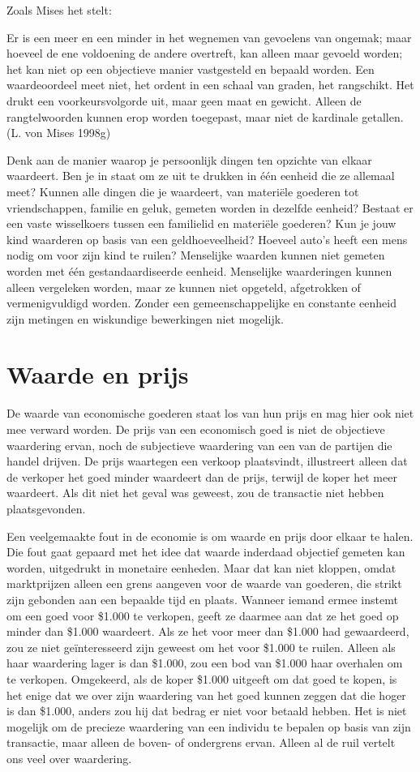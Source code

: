 \documentclass[
  a5paper,
  smalldemyvopaper,11pt,twoside,onecolumn,openright,extrafontsizes,
hidelinks]{memoir}
\begin{document}
Zoals Mises het stelt:

Er is een meer en een minder in het wegnemen van gevoelens van ongemak;
maar hoeveel de ene voldoening de andere overtreft, kan alleen maar
gevoeld worden; het kan niet op een objectieve manier vastgesteld en
bepaald worden. Een waardeoordeel meet niet, het ordent in een schaal
van graden, het rangschikt. Het drukt een voorkeursvolgorde uit, maar
geen maat en gewicht. Alleen de rangtelwoorden kunnen erop worden
toegepast, maar niet de kardinale getallen. (L. von Mises 1998g)

Denk aan de manier waarop je persoonlijk dingen ten opzichte van elkaar
waardeert. Ben je in staat om ze uit te drukken in één eenheid die ze
allemaal meet? Kunnen alle dingen die je waardeert, van materiële
goederen tot vriendschappen, familie en geluk, gemeten worden in
dezelfde eenheid? Bestaat er een vaste wisselkoers tussen een familielid
en materiële goederen? Kun je jouw kind waarderen op basis van een
geldhoeveelheid? Hoeveel auto's heeft een mens nodig om voor zijn kind
te ruilen? Menselijke waarden kunnen niet gemeten worden met één
gestandaardiseerde eenheid. Menselijke waarderingen kunnen alleen
vergeleken worden, maar ze kunnen niet opgeteld, afgetrokken of
vermenigvuldigd worden. Zonder een gemeenschappelijke en constante
eenheid zijn metingen en wiskundige bewerkingen niet mogelijk.

\section{Waarde en prijs}\label{waarde-en-prijs}

De waarde van economische goederen staat los van hun prijs en mag hier
ook niet mee verward worden. De prijs van een economisch goed is niet de
objectieve waardering ervan, noch de subjectieve waardering van een van
de partijen die handel drijven. De prijs waartegen een verkoop
plaatsvindt, illustreert alleen dat de verkoper het goed minder
waardeert dan de prijs, terwijl de koper het meer waardeert. Als dit
niet het geval was geweest, zou de transactie niet hebben
plaatsgevonden.

Een veelgemaakte fout in de economie is om waarde en prijs door elkaar
te halen. Die fout gaat gepaard met het idee dat waarde inderdaad
objectief gemeten kan worden, uitgedrukt in monetaire eenheden. Maar dat
kan niet kloppen, omdat marktprijzen alleen een grens aangeven voor de
waarde van goederen, die strikt zijn gebonden aan een bepaalde tijd en
plaats. Wanneer iemand ermee instemt om een goed voor \$1.000 te
verkopen, geeft ze daarmee aan dat ze het goed op minder dan \$1.000
waardeert. Als ze het voor meer dan \$1.000 had gewaardeerd, zou ze niet
geïnteresseerd zijn geweest om het voor \$1.000 te ruilen. Alleen als
haar waardering lager is dan \$1.000, zou een bod van \$1.000 haar
overhalen om te verkopen. Omgekeerd, als de koper \$1.000 uitgeeft om
dat goed te kopen, is het enige dat we over zijn waardering van het goed
kunnen zeggen dat die hoger is dan \$1.000, anders zou hij dat bedrag er
niet voor betaald hebben. Het is niet mogelijk om de precieze waardering
van een individu te bepalen op basis van zijn transactie, maar alleen de
boven- of ondergrens ervan. Alleen al de ruil vertelt ons veel over
waardering.
\end{document}
